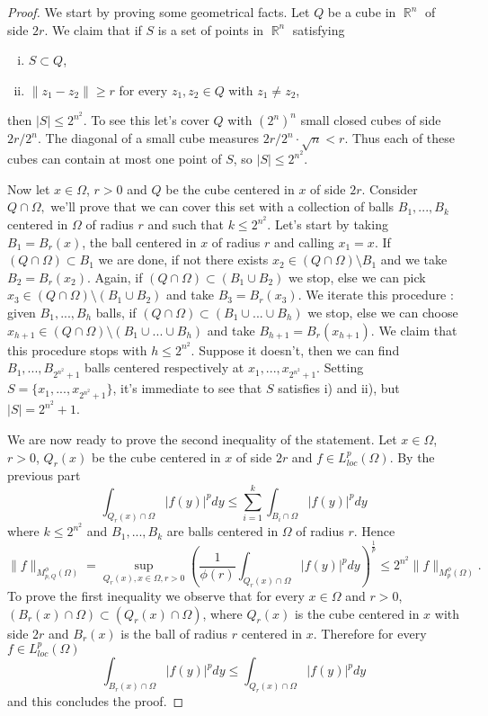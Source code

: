 \documentclass[12pt]{article}
\theoremstyle{definition}
\DeclareMathOperator\rr{\mathbb{R}}
\begin{document}
\begin{proof}
We start by proving some geometrical facts. Let $Q$ be a cube in $\rr^n$ of side $2r$. We claim that if $S$ is a set of points in $\rr^n$ satisfying
\begin{enumerate}[i)]
\item  	$S \subset Q$,
\item $\|z_1-z_2 \|\ge r$ for every $z_1,z_2 \in Q$ with $z_1 \neq z_2$,
\end{enumerate}
then $|S|\le2^{n^2}.$ To see this let's cover $Q$ with $(2^n)^n$ small closed cubes of side $2r/2^n$. The diagonal of a small cube measures $2r/2^n \cdot \sqrt{n}<r$.
Thus each of these cubes can contain at most one point of $S$, so $|S|\le2^{n^2}.$ 

Now let $x \in \Omega$, $r>0$ and $Q$ be the cube centered in $x$ of side $2r$. Consider $Q \cap \Omega,$ we'll prove that we can cover this set with a collection of balls $B_1,...,B_k$ centered in $\Omega$ of radius $r$ and such that $k\le 2^{n^2}.$ Let's start by taking $B_1=B_r(x)$, the ball centered in $x$ of radius $r$ and calling $x_1=x$. If $(Q\cap \Omega )\subset B_1$ we are done, if not there exists $x_2 \in (Q \cap \Omega)\setminus B_1$ and we take $B_2=B_r(x_2).$ Again, if $(Q\cap \Omega )\subset (B_1\cup B_2)$ we stop, else we can pick $x_3 \in (Q \cap \Omega)\setminus (B_1 \cup B_2)$ and take $B_3=B_r(x_3).$ We iterate this procedure : given $B_1,...,B_h$ balls, if $(Q\cap \Omega )\subset (B_1\cup...\cup B_h)$ we stop, else we can choose $x_{h+1} \in (Q\cap \Omega )\setminus (B_1\cup...\cup B_h)$ and take $B_{h+1}=B_r(x_{h+1}).$ We claim that this procedure stops with $h\le 2^{n^2}.$ Suppose it doesn't, then we can find $B_1,...,B_{2^{n^2}+1}$ balls centered respectively at $x_1,...,x_{2^{n^2}+1}$. Setting $S= \{x_1,...,x_{2^{n^2}+1} \}$, it's immediate to see that $S$ satisfies i) and ii), but $|S|=2^{n^2}+1$.

We are now ready to prove the second inequality of the statement. Let $x \in \Omega$, $r>0$, $Q_r(x)$ be the cube centered in $x$ of side $2r$ and $f \in L^p_{loc}(\Omega)$. By the previous part 
\[ 	\int_{Q_r(x)\cap\Omega} |f(y)|^p dy \le \sum_{i=1}^k \int_{B_i\cap\Omega} |f(y)|^p dy\]
where $k\le 2^{n^2}$ and $B_1,...,B_k$ are balls centered in $\Omega$ of radius $r$. Hence
\[ \| f\|_{M_{p,Q}^\phi(\Omega)}=\sup_{Q_r(x) ,x \in \Omega,r>0} \left( \frac{1}{\phi(r)}\int_{Q_r(x)\cap\Omega} |f(y)|^p dy \right)^{\frac{1}{p}} \le 2^{n^2} \| f\|_{M_p^\phi(\Omega)}.\]
To prove the first inequality we observe that for every $x \in \Omega$ and $r>0$, $(B_r(x)\cap\Omega)\subset (Q_r(x)\cap\Omega)$, where $Q_r(x)$ is the cube centered in $x$ with side $2r$ and $B_r(x)$ is the ball of radius $r$ centered in $x$. Therefore for every $f \in L^p_{loc}(\Omega)$
\[ \int_{B_r(x)\cap\Omega} |f(y)|^p dy \le \int_{Q_r(x)\cap\Omega} |f(y)|^p dy\]
and this concludes the proof.

\end{proof}
\end{document}
